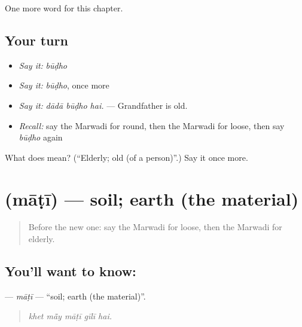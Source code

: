 \begin{grammarlens}[title={What you've built}]
One more word for this chapter.
\end{grammarlens}

\subsection*{Your turn}
\begin{itemize}
\raggedright
  \item \emph{Say it:} \emph{būḍho}
  \item \emph{Say it:} \emph{būḍho}, once more
  \item \emph{Say it:} \emph{dādā būḍho hai.} — Grandfather is old.
  \item \emph{Recall:} say the Marwadi for round, then the Marwadi for loose, then say \emph{būḍho} again
\end{itemize}

\begin{tcolorbox}[breakable,colback=teal!4,colframe=teal!35!black,title={Before you move on}]
What does  mean? (\textquotedblleft{}Elderly; old (of a person)\textquotedblright{}.) Say it once more.
\end{tcolorbox}
\section[\texorpdfstring{\mw{माटी} (māṭī)}{माटी (māṭī)}]{ (māṭī) — soil; earth (the material)}

\label{lesson:MW-C232-mati}



\begin{quote}
Before the new one: say the Marwadi for loose, then the Marwadi for elderly.
\end{quote}

\subsection*{You'll want to know: }
\textbf{} — \emph{māṭī} — \textquotedblleft{}soil; earth (the material)\textquotedblright{}.

\begin{quote}
    
\end{quote}

\begin{quote}
\emph{khet mā̃y māṭī gīlī hai.}
\end{quote}


